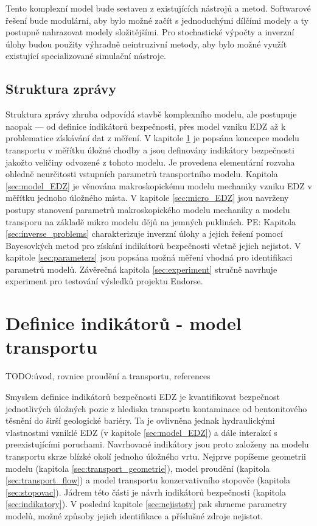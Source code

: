 \documentclass{article}
\def\todo#1{{TODO:\color{violet}#1}}
\newcommand{\pe}[1]{{\color{orange} PE: #1}}
\begin{document}
Tento komplexní model bude sestaven z existujících nástrojů a metod. Softwarové řešení bude modulární, aby bylo možné začít s
jednoduchými dílčími modely a ty postupně nahrazovat modely složitějšími. Pro stochastické výpočty a inverzní úlohy budou 
použity výhradně neintruzivní metody, aby bylo možné využít existující specializované simulační nástroje.

    
\subsection{Struktura zprávy}
Struktura zprávy zhruba odpovídá stavbě komplexního modelu, ale postupuje naopak --- od definice indikátorů bezpečnosti,
přes model vzniku EDZ až k problematice získávání dat z měření. 
V kapitole \ref{sec:transport} je popsána koncepce modelu transportu v měřítku úložné chodby a 
jsou definovány indikátory bezpečnosti jakožto veličiny odvozené z tohoto modelu. Je provedena elementární rozvaha ohledně 
neurčitosti vstupních parametrů transportního modelu. Kapitola
\ref{sec:model_EDZ} je věnována makroskopickému modelu mechaniky vzniku EDZ v měřítku jednoho úložného místa. 
V kapitole \ref{sec:micro_EDZ} jsou navrženy postupy stanovení parametrů makroskopického modelu mechaniky a modelu transporu 
na základě mikro modelu dějů na jemných puklinách.
\pe{Kapitola \ref{sec:inverse_problems} charakterizuje inverzní úlohy a jejich řešení pomocí Bayesovkých metod 
pro získání indikátorů bezpečnosti včetně jejich nejistot.}
V kapitole \ref{sec:parameters} jsou popsána možná měření vhodná pro identifikaci 
parametrů modelů. Závěrečná kapitola \ref{sec:experiment} stručně navrhuje experiment pro testování výsledků projektu Endorse.


\section{Definice indikátorů - model transportu}
\label{sec:transport}
\todo{úvod, rovnice proudění a transportu, references}

Smyslem definice indikátorů bezpečnosti EDZ je kvantifikovat bezpečnost jednotlivých úložných pozic z hlediska 
transportu kontaminace od bentonitového těsnění do širší geologické bariéry. Ta je ovlivněna jednak hydraulickými vlastnostmi
vzniklé EDZ (v kapitole \ref{sec:model_EDZ}) a dále interakcí s preexistujícími poruchami. 
Navrhované indikátory jsou proto založeny na modelu transportu skrze blízké okolí jednoho úložného vrtu. 
Nejprve popíšeme geometrii modelu (kapitola  \ref{sec:transport_geometrie}), model proudění (kapitola \ref{sec:transport_flow})
a model transportu konzervativního stopovče (kapitola \ref{sec:stopovac}). Jádrem této části je návrh indikátorů bezpečnosti (kapitola \ref{sec:indikatory}). 
V poslední kapitole \ref{sec:nejistoty} pak shrneme parametry modelů, možné způsoby jejich identifikace a příslušné zdroje nejistot.
\end{document}
